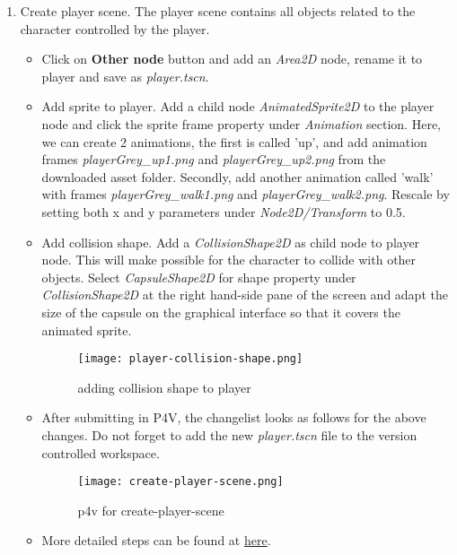 \begin{enumerate}
    \item Create player scene. The player scene contains all objects related to the character controlled by the player.
    \begin{itemize}
        \item Click on \textbf{Other node} button and add an \textit{Area2D} node, rename it to player and save as 
        \textit{player.tscn}.
        \item Add sprite to player. Add a child node \textit{AnimatedSprite2D} to the player node and click the sprite frame
        property under \textit{Animation} section. Here, we can create 2 animations, the first is called 'up', and add 
        animation frames \textit{playerGrey\_up1.png} and \textit{playerGrey\_up2.png} from the downloaded asset folder.
        Secondly, add another animation called 'walk' with frames 
        \textit{playerGrey\_walk1.png} and \textit{playerGrey\_walk2.png}. Rescale by setting both x and y parameters under 
        \textit{Node2D/Transform} to 0.5.
        \item Add collision shape. Add a \textit{CollisionShape2D} as child node to player node. This will make possible
        for the character to collide with other objects. Select \textit{CapsuleShape2D} for shape property under 
        \textit{CollisionShape2D} at the right hand-side pane of the screen and adapt the size of the capsule on the 
        graphical interface so that it covers the animated sprite.
        \begin{figure}[H]
            \centering
            \texttt{[image: player-collision-shape.png]}
              \caption{adding collision shape to player}
              \label{fig:player-collision-shape}
        \end{figure}
        \item After submitting in P4V, the changelist looks as follows for the above changes. Do not forget to add 
        the new \textit{player.tscn} file to the version controlled workspace.
        \begin{figure}[H]
            \centering
            \texttt{[image: create-player-scene.png]}
              \caption{p4v for create-player-scene}
              \label{fig:create-player-scene}
        \end{figure}
        \item More detailed steps can be found at 
        \href{https://docs.godotengine.org/en/stable/getting_started/first_2d_game/02.player_scene.html}{\color{blue}here}.
    \end{itemize}
\end{enumerate}